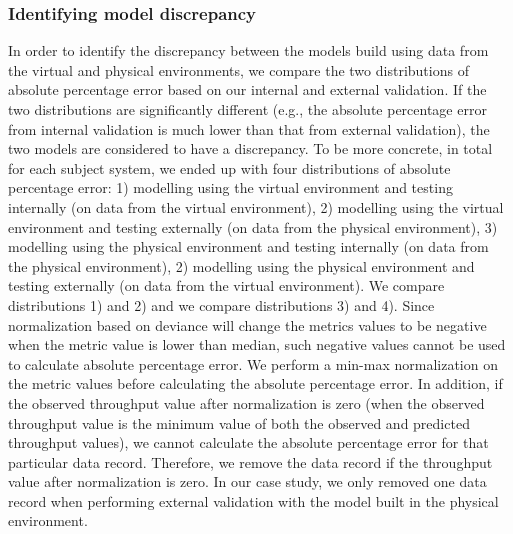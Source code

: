 \subsubsection{Identifying model discrepancy}
In order to identify the discrepancy between the models build using data from the virtual and physical environments, we compare the two distributions of absolute percentage error based on our internal and external validation. If the two distributions are significantly different (e.g., the absolute percentage error from internal validation is much lower than that from external validation), the two models are considered to have a discrepancy. To be more concrete, in total for each subject system, we ended up with four distributions of absolute percentage error: 1) modelling using the virtual environment and testing internally (on data from the virtual environment), 2) modelling using the virtual environment and testing externally (on data from the physical environment), 3) modelling using the physical environment and testing internally (on data from the physical environment), 2) modelling using the physical environment and testing externally (on data from the virtual environment). We compare distributions 1) and 2) and we compare distributions 3) and 4). Since normalization based on deviance will change the metrics values to be negative when the metric value is lower than median, such negative values cannot be used to calculate absolute percentage error. We perform a min-max normalization on the metric values before calculating the absolute percentage error. In addition, if the observed throughput value after normalization is zero (when the observed throughput value is the minimum value of both the observed and predicted throughput values), we cannot calculate the absolute percentage error for that particular data record. Therefore, we remove the data record if the throughput value after normalization is zero. In our case study, we only removed one data record when performing external validation with the model built in the physical environment. 







